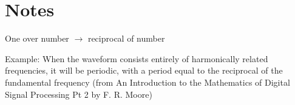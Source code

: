 \section{Notes}\label{sec:conclusion}
One over number $\rightarrow$ reciprocal of number

Example: When the waveform consists
entirely of harmonically related frequencies, it will be periodic, with a period equal to the reciprocal of the fundamental frequency (from An Introduction to the Mathematics of Digital Signal Processing Pt 2 by F. R. Moore)